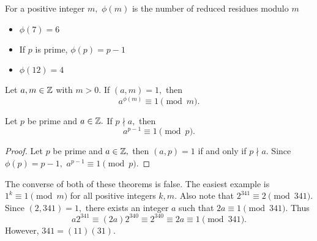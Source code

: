 \documentclass{ximera}
\begin{document}
\begin{remark}
    For a positive integer $m,$ $\phi(m)$ is the number of reduced residues modulo $m$
\end{remark}
\begin{example}\label{example:phi}
    
    \begin{itemize}
        \item $\phi(7)=6$
        
        \item If $p$ is prime, $\phi(p)=p-1$
        
        \item $\phi(12)=4$
    \end{itemize}
\end{example}

\begin{theorem}\label{thm:euler-FlT}
    Let $a,m\in\mathbb Z$ with $m>0.$ If $(a,m)=1,$ then \[a^{\phi(m)}\equiv 1\pmod{m}.\]
\end{theorem}



\begin{corollary}\label{FlT}
    Let $p$ be prime and $a\in\mathbb Z.$ If $p\nmid a,$ then \[a^{p-1}\equiv 1\pmod{p}.\]

    \begin{proof}
        Let $p$ be prime and $a\in\mathbb Z,$ then $(a,p)=1$ if and only if $p\nmid a.$ Since $\phi(p)=p-1,$ $a^{p-1}\equiv 1\pmod{p}.$
    \end{proof}
\end{corollary}

\begin{warning}
    The converse of both of these theorems is false. The easiest example is $1^k\equiv 1\pmod{m}$ for all positive integers $k, m$. Also note that $2^{341}\equiv 2\pmod{341}$. Since $(2,341)=1,$ there exists an integer $a$ such that $2a\equiv 1\pmod{341}.$ Thus \[a2^{341}\equiv (2a)2^{340}\equiv 2^{340}\equiv 2a\equiv 1\pmod{341}.\]
    However, $341=(11)(31).$
\end{warning}
\end{document}
